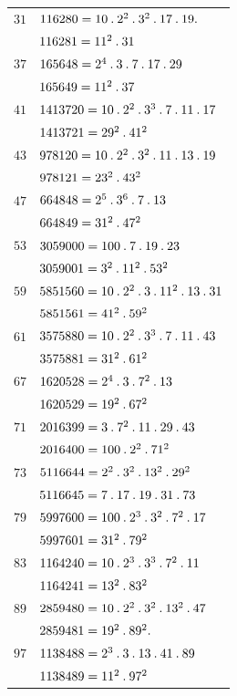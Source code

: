 \par{}%
\begingroup\renewcommand{\arraystretch}{1.08}
\begin{longtable}{@{}rl@{}}
$31$ & $116280=10\mathbin{.} 2^{2}\mathbin{.} 3^{2}\mathbin{.} 17\mathbin{.} 19\mathbin{.}$\\
 & $116281=11^{2}\mathbin{.} 31$\\
$37$ & $165648=2^{4}\mathbin{.} 3\mathbin{.} 7\mathbin{.} 17\mathbin{.} 29$\\
 & $165649=11^{2}\mathbin{.} 37$\\
$41$ & $1413720=10\mathbin{.} 2^{2}\mathbin{.} 3^{3}\mathbin{.} 7\mathbin{.} 11\mathbin{.} 17$\\
 & $1413721=29^{2}\mathbin{.} 41^{2}$\\
$43$ & $978120=10\mathbin{.} 2^{2}\mathbin{.} 3^{2}\mathbin{.} 11\mathbin{.} 13\mathbin{.} 19$\\
 & $978121=23^{2}\mathbin{.} 43^{2}$\\
$47$ & $664848=2^{5}\mathbin{.} 3^{6}\mathbin{.} 7\mathbin{.} 13$\\
 & $664849=31^{2}\mathbin{.} 47^{2}$\\
$53$ & $3059000=100\mathbin{.} 7\mathbin{.} 19\mathbin{.} 23$\\
 & $3059001=3^{2}\mathbin{.} 11^{2}\mathbin{.} 53^{2}$\\
$59$ & $5851560=10\mathbin{.} 2^{2}\mathbin{.} 3\mathbin{.} 11^{2}\mathbin{.} 13\mathbin{.} 31$\\
 & $5851561=41^{2}\mathbin{.} 59^{2}$\\
$61$ & $3575880=10\mathbin{.} 2^{2}\mathbin{.} 3^{3}\mathbin{.} 7\mathbin{.} 11\mathbin{.} 43$\\
 & $3575881=31^{2}\mathbin{.} 61^{2}$\\
$67$ & $1620528=2^{4}\mathbin{.} 3\mathbin{.} 7^{2}\mathbin{.} 13$\\
 & $1620529=19^{2}\mathbin{.} 67^{2}$\\
$71$ & $2016399=3\mathbin{.} 7^{2}\mathbin{.} 11\mathbin{.} 29\mathbin{.} 43$\\
 & $2016400=100\mathbin{.} 2^{2}\mathbin{.} 71^{2}$\\
$73$ & $5116644=2^{2}\mathbin{.} 3^{2}\mathbin{.} 13^{2}\mathbin{.} 29^{2}$\\
 & $5116645=7\mathbin{.} 17\mathbin{.} 19\mathbin{.} 31\mathbin{.} 73$\\
$79$ & $5997600=100\mathbin{.} 2^{3}\mathbin{.} 3^{2}\mathbin{.} 7^{2}\mathbin{.} 17$\\
 & $5997601=31^{2}\mathbin{.} 79^{2}$\\
$83$ & $1164240=10\mathbin{.} 2^{3}\mathbin{.} 3^{3}\mathbin{.} 7^{2}\mathbin{.} 11$\\
 & $1164241=13^{2}\mathbin{.} 83^{2}$\\
$89$ & $2859480=10\mathbin{.} 2^{2}\mathbin{.} 3^{2}\mathbin{.} 13^{2}\mathbin{.} 47$\\
 & $2859481=19^{2}\mathbin{.} 89^{2}\mathbin{.}$\\
$97$ & $1138488=2^{3}\mathbin{.} 3\mathbin{.} 13\mathbin{.} 41\mathbin{.} 89$\\
 & $1138489=11^{2}\mathbin{.} 97^{2}$\\
\end{longtable}\endgroup
